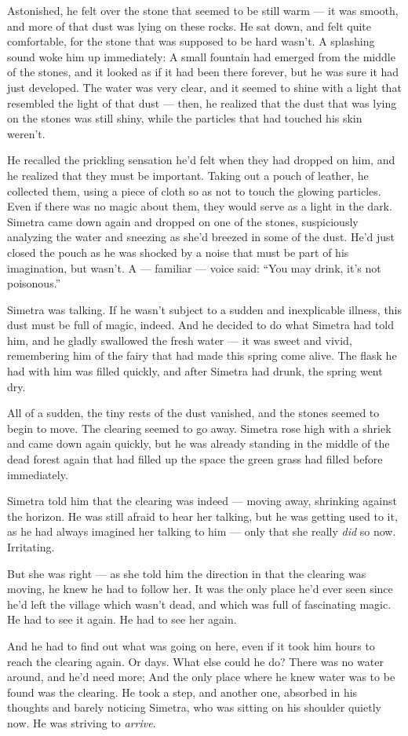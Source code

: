 Astonished, he felt over the stone that seemed to be still warm --- it was smooth, and more of that dust was lying on these rocks. He sat down, and felt quite comfortable, for the stone that was supposed to be hard wasn't. 
A splashing sound woke him up immediately: A small fountain had emerged from the middle of the stones, and it looked as if it had been there forever, but he was sure it had just developed. 
The water was very clear, and it seemed to shine with a light that resembled the light of that dust --- then, he realized that the dust that was lying on the stones was still shiny, while the particles that had touched his skin weren't.

He recalled the prickling sensation he'd felt when they had dropped on him, and he realized that they must be important. Taking out a pouch of leather, he collected them, using a piece of cloth so as not to touch the glowing particles. Even if there was no magic about them, they would serve as a light in the dark. 
Simetra came down again and dropped on one of the stones, suspiciously analyzing the water and sneezing as she'd breezed in some of the dust. 
He'd just closed the pouch as he was shocked by a noise that must be part of his imagination, but wasn't. A --- familiar --- voice said: \enquote{You may drink, it's not poisonous.}

Simetra was talking.
If he wasn't subject to a sudden and inexplicable illness, this dust must be full of magic, indeed. 
And he decided to do what Simetra had told him, and he gladly swallowed the fresh water --- it was sweet and vivid, remembering him of the fairy that had made this spring come alive. The flask he had with him was filled quickly, and after Simetra had drunk, the spring went dry.

All of a sudden, the tiny rests of the dust vanished, and the stones seemed to begin to move. The clearing seemed to go away. 
Simetra rose high with a shriek and came down again quickly, but he was already standing in the middle of the dead forest again that had filled up the space the green grass had filled before immediately.

Simetra told him that the clearing was indeed --- moving away, shrinking against the horizon.
He was still afraid to hear her talking, but he was getting used to it, as he had always imagined her talking to him --- only that she really \emph{did} so now. Irritating.

But she was right --- as she told him the direction in that the clearing was moving, he knew he had to follow her. It was the only place he'd ever seen since he'd left the village which wasn't dead, and which was full of fascinating magic. 
He had to see it again. 
He had to see her again.

And he had to find out what was going on here, even if it took him hours to reach the clearing again. Or days. 
What else could he do? There was no water around, and he'd need more; And the only place where he knew water was to be found was the clearing. 
He took a step, and another one, absorbed in his thoughts and barely noticing Simetra, who was sitting on his shoulder quietly now. 
He was striving to \emph{arrive}. 
